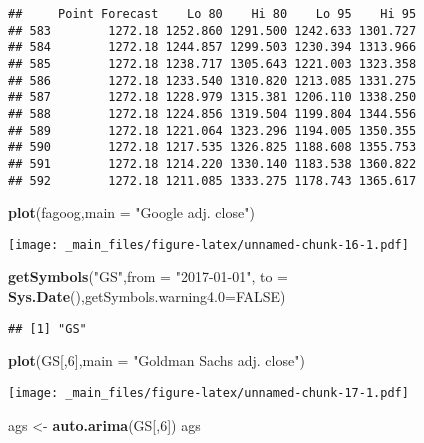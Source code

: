 \documentclass[]{book}
\newenvironment{Shaded}{\begin{snugshade}}{\end{snugshade}}
\newcommand{\DataTypeTok}[1]{\textcolor[rgb]{0.13,0.29,0.53}{#1}}
\newcommand{\DecValTok}[1]{\textcolor[rgb]{0.00,0.00,0.81}{#1}}
\newcommand{\KeywordTok}[1]{\textcolor[rgb]{0.13,0.29,0.53}{\textbf{#1}}}
\newcommand{\NormalTok}[1]{#1}
\newcommand{\OtherTok}[1]{\textcolor[rgb]{0.56,0.35,0.01}{#1}}
\newcommand{\StringTok}[1]{\textcolor[rgb]{0.31,0.60,0.02}{#1}}
\begin{document}
\begin{verbatim}
##     Point Forecast    Lo 80    Hi 80    Lo 95    Hi 95
## 583        1272.18 1252.860 1291.500 1242.633 1301.727
## 584        1272.18 1244.857 1299.503 1230.394 1313.966
## 585        1272.18 1238.717 1305.643 1221.003 1323.358
## 586        1272.18 1233.540 1310.820 1213.085 1331.275
## 587        1272.18 1228.979 1315.381 1206.110 1338.250
## 588        1272.18 1224.856 1319.504 1199.804 1344.556
## 589        1272.18 1221.064 1323.296 1194.005 1350.355
## 590        1272.18 1217.535 1326.825 1188.608 1355.753
## 591        1272.18 1214.220 1330.140 1183.538 1360.822
## 592        1272.18 1211.085 1333.275 1178.743 1365.617
\end{verbatim}

\begin{Shaded}
\begin{Highlighting}[]
\KeywordTok{plot}\NormalTok{(fagoog,}\DataTypeTok{main =} \StringTok{"Google adj. close"}\NormalTok{)}
\end{Highlighting}
\end{Shaded}

\texttt{[image: \_main\_files/figure-latex/unnamed-chunk-16-1.pdf]}

\begin{Shaded}
\begin{Highlighting}[]
\KeywordTok{getSymbols}\NormalTok{(}\StringTok{"GS"}\NormalTok{,}\DataTypeTok{from =} \StringTok{"2017-01-01"}\NormalTok{, }\DataTypeTok{to =} \KeywordTok{Sys.Date}\NormalTok{(),}\DataTypeTok{getSymbols.warning4.0=}\OtherTok{FALSE}\NormalTok{)}
\end{Highlighting}
\end{Shaded}

\begin{verbatim}
## [1] "GS"
\end{verbatim}

\begin{Shaded}
\begin{Highlighting}[]
\KeywordTok{plot}\NormalTok{(GS[,}\DecValTok{6}\NormalTok{],}\DataTypeTok{main =} \StringTok{"Goldman Sachs adj. close"}\NormalTok{)}
\end{Highlighting}
\end{Shaded}

\texttt{[image: \_main\_files/figure-latex/unnamed-chunk-17-1.pdf]}

\begin{Shaded}
\begin{Highlighting}[]
\NormalTok{ags <-}\StringTok{ }\KeywordTok{auto.arima}\NormalTok{(GS[,}\DecValTok{6}\NormalTok{])}
\NormalTok{ags}
\end{Highlighting}
\end{Shaded}
\end{document}

